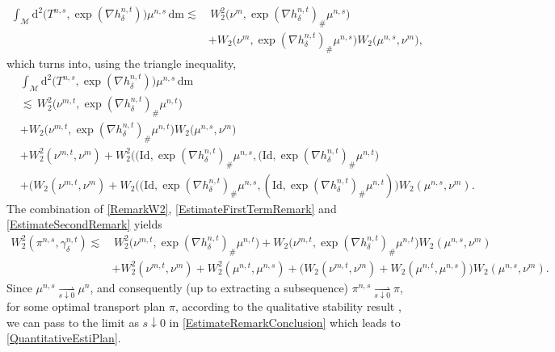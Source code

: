 \documentclass[11pt,a4paper,oneside]{amsart}
\numberwithin{equation}{section}
\newcommand{\dd}{\mathrm{d}}
\newcommand{\m}{\mathrm{m}}
\begin{document}
%
\begin{equation*}%
%
\begin{aligned}
%
\int_{\mathcal{M}}\dd^2 \big(T^{n,s}, \exp(\nabla h^{n,t}_\delta)\big)\mu^{n,s}\,\dd\m \lesssim&\,W_2^2 \big(\nu^m,\exp(\nabla h^{n,t}_\delta)_\#\mu^{n,s}\big)\\
&+W_2\big(\nu^m,\exp(\nabla h^{n,t}_\delta)_\#\mu^{n,s}\big) W_2\big(\mu^{n,s},\nu^m\big),
%
\end{aligned}
%
\end{equation*}
%
which turns into, using the triangle inequality,
%
\begin{equation}\label{EstimateSecondRemark}
%
\begin{aligned}
%
&\int_{\mathcal{M}}\dd^2 \big(T^{n,s}, \exp(\nabla h^{n,t}_\delta)\big)\mu^{n,s}\,\dd\m\\
&\lesssim\,W_2^2 \big(\nu^{m,t},\exp(\nabla h^{n,t}_\delta)_\#\mu^{n,t}\big)\\
&+W_2\big(\nu^{m,t},\exp(\nabla h^{n,t}_\delta)_\#\mu^{n,t}\big) W_2\big(\mu^{n,s},\nu^m\big)\\
&+W^2_2(\nu^{m,t},\nu^m)+W^2_2\big((\mathrm{Id},\exp(\nabla h^{n,t}_\delta)_\#\mu^{n,s},(\mathrm{Id},\exp(\nabla h^{n,t}_\delta)_\#\mu^{n,t}\big)\\
&+\big(W_2(\nu^{m,t},\nu^m)+W_2((\mathrm{Id},\exp(\nabla h^{n,t}_\delta)_\#\mu^{n,s},(\mathrm{Id},\exp(\nabla h^{n,t}_\delta)_\#\mu^{n,t})\big)W_2(\mu^{n,s},\nu^m).
%
\end{aligned}
%
\end{equation}
%
The combination of \eqref{RemarkW2}, \eqref{EstimateFirstTermRemark} and \eqref{EstimateSecondRemark} yields
%
\begin{equation}\label{EstimateRemarkConclusion}
%
\begin{aligned}
W^2_2(\pi^{n,s},\gamma^{n,t}_\delta)\lesssim&\, W^2_2\big(\nu^{m,t},\exp(\nabla h^{n,t}_\delta)_\#\mu^{n,t}\big)+W_2\big(\nu^{m,t},\exp(\nabla h^{n,t}_\delta)_\#\mu^{n,t}\big)W_2(\mu^{n,s},\nu^{m})\\
&+W^2_2(\nu^{m,t},\nu^{m})+W^2_2(\mu^{n,t},\mu^{n,s})+\big(W_2(\nu^{m,t},\nu^m)+W_2(\mu^{n,t},\mu^{n,s})\big)W_2(\mu^{n,s},\nu^m).
\end{aligned}
%
\end{equation}
%
Since $\mu^{n,s}\underset{s\downarrow 0}{\rightharpoonup}\mu^{n}$, and consequently (up to extracting a subsequence) $\pi^{n,s}\underset{s\downarrow 0}{\rightharpoonup}\pi$, for some optimal transport plan $\pi$, according to the qualitative stability result \cite[Theorem 5.20]{OldNewVillani}, we can pass to the limit as $s\downarrow 0$ in \eqref{EstimateRemarkConclusion} which leads to \eqref{QuantitativeEstiPlan}.
\end{document}
